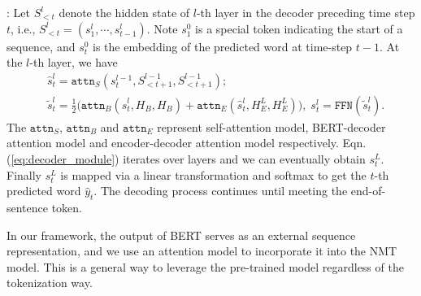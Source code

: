 \documentclass{article} \usepackage{iclr2020_conference,times}
\newcommand{\attn}{\texttt{attn}}
\newcommand{\ffn}{\texttt{FFN}}
\newcommand{\myeqref}[1]{Eqn.(\ref{#1})}
\begin{document}
: Let $S^l_{<t}$ denote the hidden state of $l$-th layer in the decoder preceding time step $t$, i.e., $S^l_{<t}=(s^l_1,\cdots,s^l_{t-1})$. Note $s^0_1$ is a special token indicating the start of a sequence, and $s^0_t$ is the embedding of the predicted word at time-step $t-1$. At the $l$-th layer, we have
\begin{equation}
\begin{aligned}
&\hat{s}^l_{t}=\attn_S(s^{l-1}_t, S^{l-1}_{<t+1},S^{l-1}_{<t+1});\\
& \tilde{s}^l_{t}=\frac{1}{2}\big(\attn_B(\hat{s}^l_{t}, H_B,H_B)+\attn_E(\hat{s}^l_{t}, H_E^L,H_E^L)\big),\;
s^l_t = \ffn(\tilde{s}^l_t).
\end{aligned}
\label{eq:decoder_module}
\end{equation}
The $\attn_S$, $\attn_B$ and $\attn_E$ represent self-attention model, BERT-decoder attention model and encoder-decoder attention model respectively. \myeqref{eq:decoder_module} iterates over layers and we can eventually obtain $s^L_t$. Finally $s^L_t$ is mapped via a linear transformation and softmax to get the $t$-th predicted word $\hat{y}_t$. The decoding process continues until meeting the end-of-sentence token.

In our framework, the output of BERT serves as an external sequence representation, and we use an attention model to incorporate it into the NMT model. This is a general way to leverage the pre-trained model regardless of the tokenization way. 
\end{document}
